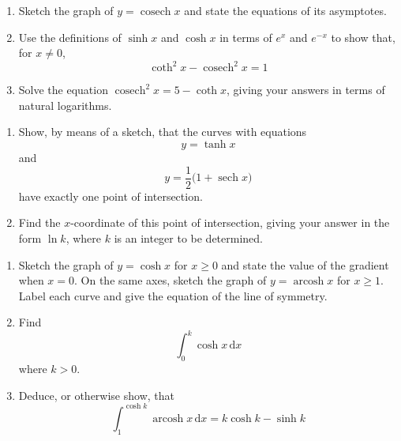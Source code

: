 \documentclass[leqno]{article}
\begin{document}
\begin{enumerate}[
  label=\textbf{\arabic*.},
  leftmargin=*,
  topsep=0pt,
  partopsep=0pt,
  parsep=0pt
]
\begin{enumerate}[label=\textbf{(\alph*)}]
  \item Sketch the graph of $y=\operatorname{cosech} x$ and state the equations of its asymptotes.  \\
  \item Use the definitions of $\sinh x$ and $\cosh x$ in terms of $e^x$ and $e^{-x}$ to show that, for $x\ne 0$,
  \[
  \coth^2 x - \operatorname{cosech}^2 x = 1
  \]
  \item Solve the equation $\operatorname{cosech}^2 x = 5 - \coth x$, giving your answers in terms of natural logarithms.  \\
\end{enumerate}

\newpage

\questionitem

\begin{enumerate}[label=\textbf{(\alph*)}]
  \item Show, by means of a sketch, that the curves with equations
  \[
  y = \tanh x
  \]
  and
  \[
  y = \frac{1}{2}\bigl(1 + \operatorname{sech} x\bigr)
  \]
  have exactly one point of intersection.  \\
  \item Find the $x$-coordinate of this point of intersection, giving your answer in the form $\ln k$, where $k$ is an integer to be determined.  \\
\end{enumerate}

\newpage

\questionitem

\begin{enumerate}[label=(\roman*)]
  \item Sketch the graph of $y=\cosh x$ for $x\ge 0$ and state the value of the gradient when $x=0$. On the same axes, sketch the graph of $y=\operatorname{arcosh} x$ for $x\ge 1$. Label each curve and give the equation of the line of symmetry.  \\
  \item Find
  \[
  \int_0^k \cosh x\,\mathrm{d}x
  \]
  where $k>0$.  \\
  \item Deduce, or otherwise show, that
  \[
  \int_1^{\cosh k} \operatorname{arcosh} x\,\mathrm{d}x = k\cosh k - \sinh k
  \]
\end{enumerate}
\newpage
\questionitem


\end{enumerate}
\end{document}

